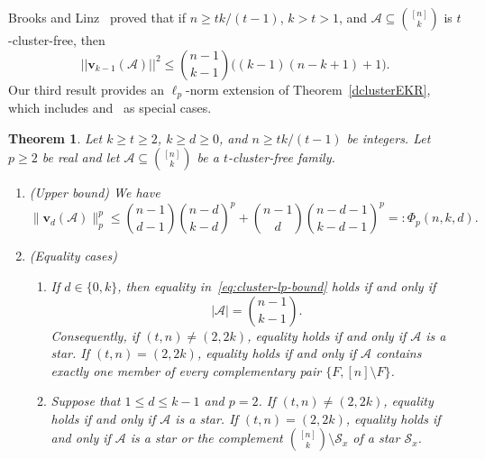 \documentclass[11pt]{article}
\numberwithin{equation}{section}
\newtheorem{theorem}{Theorem}[section]
\def\A{\mathcal{A}}
\begin{document}
Brooks and Linz~\cite[Theorem 3.6]{Brooks} proved that if $n\geq tk/(t-1)$, $k>t>1$, and $\A\subseteq\binom{[n]}k$ is $t$-cluster-free, then
$$||\mathbf{v}_{k-1}(\A)||^2
\leq   \binom{n-1}{k-1}\big((k-1)(n-k+ 1)+1\big). $$
Our third result provides an $\ell_p$-norm extension of Theorem~\ref{dclusterEKR}, which includes \cite[Theorem 3.6]{Brooks} and~\cite[Theorem 1.5]{Cao} as special cases.





\begin{theorem}%
\label{clusterEKRlp}
Let $k \geq t\geq 2$, $k\geq d\geq 0$, and $n\geq tk/(t-1)$ be integers.
Let $p\geq2$ be real and let
$\A\subseteq\binom{[n]}k$ be a $t$-cluster-free family.
\begin{enumerate}[label={\rm (\alph*)}]

\item {\rm(Upper bound)} We have
\begin{equation}\label{eq:cluster-lp-bound}
\|\mathbf{v}_d(\A)\|_p^p
\leq \binom{n-1}{d-1}\binom{n-d}{k-d}^{\!p}
+\binom{n-1}{d}\binom{n-d-1}{k-d-1}^{\!p}=: \Phi_p(n,k,d).
\end{equation}

\item {\rm(Equality cases)}
\begin{enumerate}[label={\rm (\roman*)}]
\item If $d\in\{0,k\}$, then equality in~\eqref{eq:cluster-lp-bound}
holds if and only if
\[
|\A|=\binom{n-1}{k-1}.
\]
Consequently, if $(t,n)\neq(2,2k)$, equality holds if and only if
$\A$ is a star.  If $(t,n)=(2,2k)$, equality holds if and only if
$\A$ contains exactly one member of every complementary pair
$\{F,[n]\setminus F\}$.

\item Suppose that $1\leq d\leq k-1$ and $p=2$.  If
$(t,n)\neq(2,2k)$, equality holds if and only if $\A$ is a star.
If $(t,n)=(2,2k)$, equality holds if and only if $\A$ is a star
or the complement $\binom{[n]}k\setminus\mathcal S_x$ of a star
$\mathcal S_x$.


\end{enumerate}
\end{enumerate}
\end{theorem}
\end{document}
